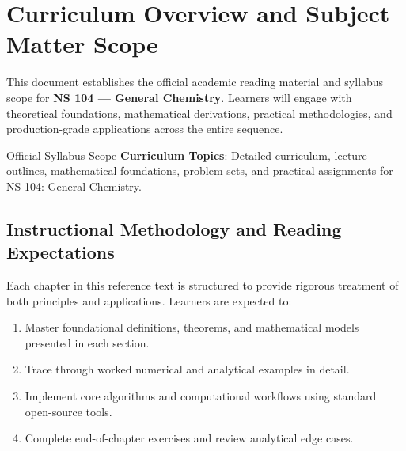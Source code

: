 \section{Curriculum Overview and Subject Matter Scope}

This document establishes the official academic reading material and syllabus scope for \textbf{NS 104 --- General Chemistry}. Learners will engage with theoretical foundations, mathematical derivations, practical methodologies, and production-grade applications across the entire sequence.

\begin{InsightBox}{Official Syllabus Scope}
  \textbf{Curriculum Topics}: Detailed curriculum, lecture outlines, mathematical foundations, problem sets, and practical assignments for NS 104: General Chemistry.
\end{InsightBox}

\subsection{Instructional Methodology and Reading Expectations}

Each chapter in this reference text is structured to provide rigorous treatment of both principles and applications. Learners are expected to:
\begin{enumerate}
  \item Master foundational definitions, theorems, and mathematical models presented in each section.
  \item Trace through worked numerical and analytical examples in detail.
  \item Implement core algorithms and computational workflows using standard open-source tools.
  \item Complete end-of-chapter exercises and review analytical edge cases.
\end{enumerate}

